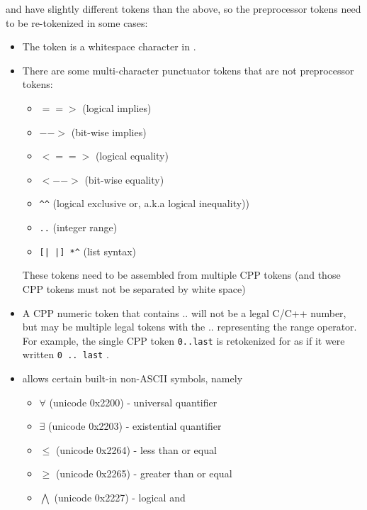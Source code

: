 \acsl and \NAME have slightly different tokens than the above, so the preprocessor tokens need to be re-tokenized in some cases:
\begin{itemize}
	\item The \@ token is a whitespace character in \acslb.
	\item There are some \acslb multi-character punctuator tokens that are not
	preprocessor tokens:
	\begin{itemize}
		\item[] $==>$ (logical implies)
		\item[] $-->$ (bit-wise implies)
		\item[] $<==>$ (logical equality)
		\item[] $<-->$ (bit-wise equality)
		\item[] \verb|^^| (logical exclusive or, a.k.a logical inequality))
                \item[] \verb|..| (integer range)
                \item[] \verb![| |] *^! (list syntax)
	\end{itemize}
	These \acslb tokens need to be assembled from multiple CPP tokens (and those CPP tokens must not be separated by white space)
	\item A CPP numeric token that contains .. will not be a legal C/C++ number, but may be multiple legal \acslb tokens with the .. representing the range operator.  For example, the single CPP token \texttt{0..last} is retokenized for \acslb as if it were written \texttt{0 .. last} .
	\item \acslb allows certain built-in non-ASCII symbols, namely
	\begin{itemize}
		\item[] $\forall$ (unicode 0x2200) - universal quantifier
		\item[] $\exists$ (unicode 0x2203) - existential quantifier
		\item[] $\leq$ (unicode 0x2264) - less than or equal
		\item[] $\geq$ (unicode 0x2265) - greater than or equal
		\item[] $\bigwedge$ (unicode 0x2227) - logical and

\end{itemize}
\end{itemize}
